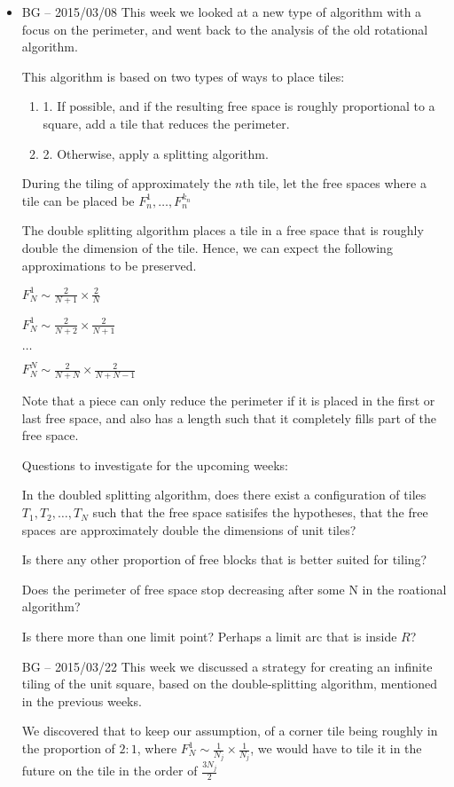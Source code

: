 \documentclass[11pt]{article}
\theoremstyle{plain}%
\theoremstyle{definition}
\theoremstyle{remark}
\numberwithin{equation}{section}
\begin{document}
\begin {itemize}
\item [BG -- 2015/03/08]
This week we looked at a new type of algorithm with a focus on the perimeter, and went back to the analysis of the old rotational algorithm.

This algorithm is based on two types of ways to place tiles:
\begin{enumerate}
\item 1.  If possible, and if the resulting free space is roughly proportional to a square, add a tile that reduces the perimeter.
\item 2. Otherwise, apply a splitting algorithm.
\end {enumerate}

During the tiling of approximately the $n$th tile, let the free spaces where a tile can be placed be $F_n^1,\ldots,F_n^{k_n}$

The double splitting algorithm places a tile in a free space that is roughly double the dimension of the tile. Hence, we can expect the following approximations to be preserved.

$F_N^{1} \sim \frac{2}{N+1} \times \frac {2}{N}$

$F_N^{1} \sim \frac{2}{N+2} \times \frac {2}{N+1}$

$\ldots$

$F_N^{N} \sim \frac{2}{N+N} \times \frac {2}{N+N-1}$

Note that a piece can only reduce the perimeter if it is placed in the first or last free space, and also has a length such that it completely fills part of the free space.


Questions to investigate for the upcoming weeks:

In the doubled splitting algorithm, does there exist a configuration of tiles $T_1, T_2, \ldots,T_N$ such that the free space satisifes the hypotheses, that the free spaces are approximately double the dimensions of unit tiles?

Is there any other proportion of free blocks that is better suited for tiling?

Does the perimeter of free space stop decreasing after some N in the roational algorithm?

Is there more than one limit point? Perhaps a limit arc that is inside $R$?

\end {itemize}

\begin{itemize}
\item [BG -- 2015/03/22]
This week we discussed a strategy for creating an infinite tiling of the unit square, based on the double-splitting algorithm, mentioned in the previous weeks. 

We discovered that to keep our assumption, of a corner tile being roughly in the proportion of $2:1$, where $F_N^{1} \sim \frac{1}{N_j} \times \frac {1}{N_j}$, we would have to tile it in the future on the tile in the order of $\frac{3N_j}{2}$

\end {itemize}
\end{document}
